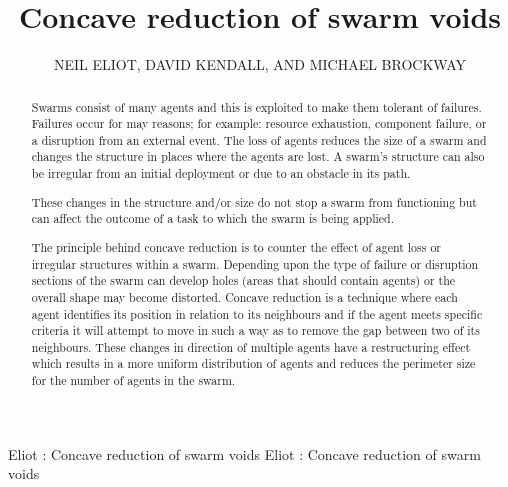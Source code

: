\documentclass{ieeeaccess}
\begin{document}
%
\title{Concave reduction of swarm voids}
\author{\uppercase{Neil Eliot},
\uppercase{David Kendall, and Michael Brockway}}
\address[1]{Northumbria University, Department of Computing and Information Sciences, Newcastle upon Tyne, NE1 8ST}

\markboth
{Eliot \headeretal: Concave reduction of swarm voids}
{Eliot \headeretal: Concave reduction of swarm voids}


\begin{abstract}
Swarms consist of many agents and this is exploited to make them tolerant of failures. Failures occur for may reasons; for example: resource exhaustion, component failure, or a disruption from an external event. The loss of agents reduces the size of a swarm and changes the structure in places where the agents are lost. A swarm's structure can also be irregular from an initial deployment or due to an obstacle in its path.

These changes in the structure and/or size do not stop a swarm from functioning but can affect the outcome of a task to which the swarm is being applied. 

The principle behind concave reduction is to counter the effect of agent loss or irregular structures within a swarm. Depending upon the type of failure or disruption sections of the swarm can develop holes (areas that should contain agents) or the overall shape may become distorted. Concave reduction is a technique where each agent identifies its position in relation to its neighbours and if the agent meets specific criteria it will attempt to move in such a way as to remove the gap between two of its neighbours. These changes in direction of multiple agents have a restructuring effect which results in a more uniform distribution of agents and reduces the perimeter size for the number of agents in the swarm.
\end{abstract}
\end{document}
